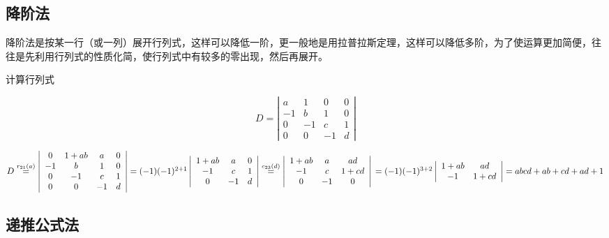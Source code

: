 \subsection{降阶法}
降阶法是按某一行（或一列）展开行列式，这样可以降低一阶，更一般地是用拉普拉斯定理，这样可以降低多阶，为了使运算更加简便，往往是先利用行列式的性质化简，使行列式中有较多的零出现，然后再展开。

\begin{example}
    计算行列式

$$D=\left|\begin{array}{cccccc}
        a  & 1  & 0  & 0 \\
        -1 & b  & 1  & 0 \\
        0  & -1 & c  & 1 \\
        0  & 0  & -1 & d
    \end{array}\right|$$
\end{example}

\begin{solution}
    \small
$D\overset{r_{21}(a)}{=}\left|\begin{array}{cccccc}
        0  & 1+ab & a  & 0 \\
        -1 & b    & 1  & 0 \\
        0  & -1   & c  & 1 \\
        0  & 0    & -1 & d
    \end{array}\right|
    =(-1)(-1)^{2+1}\left|\begin{array}{cccccc}
        1+ab & a  & 0 \\
        -1   & c  & 1 \\
        0    & -1 & d
    \end{array}\right|
    \overset{c_{23}(d)}{=}\left|\begin{array}{cccccc}
        1+ab & a  & ad   \\
        -1   & c  & 1+cd \\
        0    & -1 & 0
    \end{array}\right|  \\
    =(-1)(-1)^{3+2}\left|\begin{array}{cccccc}
        1+ab & ad   \\
        -1   & 1+cd
    \end{array}\right|=abcd+ab+cd+ad+1
$
\end{solution}
\subsection{递推公式法}

